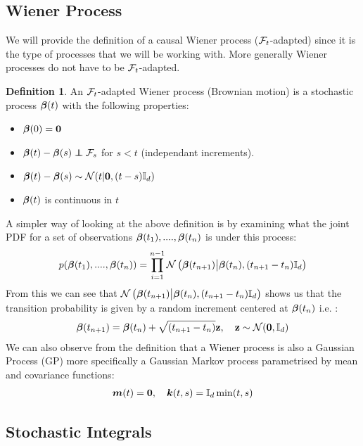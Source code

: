 \documentclass[a4paper,12pt,twoside,openright]{report}
\theoremstyle{definition}
\newtheorem{definition}{Definition}[section]
\begin{document}
\subsection{Wiener Process}

We will provide the definition of a causal Wiener process (${\mathcal{F}}_t$-adapted) since it is the type of processes that we will be working with. More generally Wiener processes do not have to be ${\mathcal{F}}_t$-adapted.
\begin{definition}
    An ${\mathcal{F}}_t$-adapted Wiener process (Brownian motion) is a stochastic process ${\bm{\beta}}(t)$ with the following properties:
    \begin{itemize}
        \item ${\bm{\beta}}(0) = {\bm{0}}$
        \item  $\rvw(t) - \rvw(s) \independent \calF_s$  for $s < t$ (independant increments).
        \item ${\bm{\beta}}(t) - {\bm{\beta}}(s) \sim {\mathcal{N}} (t | {\bm{0}},  (t - s) {\mathbb{I}_d}) $
        \item ${\bm{\beta}}(t)$ is continuous in $t$
    \end{itemize}
\end{definition}
A simpler way of looking at the above definition is by examining what the joint PDF for a set of observations ${\bm{\beta}}(t_1), ...., {\bm{\beta}}(t_n)$  is under this process:
\begin{align*}
    p({\bm{\beta}}(t_1), ...., {\bm{\beta}}(t_n)) = \prod_{i=1}^{n-1} {\mathcal{N}}\left({\bm{\beta}}(t_{n+1})\big| {\bm{\beta}}(t_{n}), (t_{n+1}- t_{n}){\mathbb{I}_d} \right)
\end{align*}
From this we can see that ${\mathcal{N}}\left({\bm{\beta}}(t_{n+1})\big| {\bm{\beta}}(t_{n}), (t_{n+1}- t_{n}){\mathbb{I}_d} \right)$ shows us that the transition probability is given by a random increment  centered at  ${\bm{\beta}}(t_{n})$ i.e. :
\begin{align*}
    {\bm{\beta}}(t_{n+1}) = {\bm{\beta}}(t_{n}) +  \sqrt{(t_{n+1}- t_{n})}{\mathbf{z}} , \quad {\mathbf{z}} \sim {\mathcal{N}}({\bm{0}}, {\mathbb{I}_d}) 
\end{align*}
We can also observe from the definition that a Wiener process is also a Gaussian Process (GP) more specifically a Gaussian Markov process parametrised by mean and covariance functions:
\begin{align*}
    {\bm{m}}(t) = {\bm{0}}, \quad {\bm{k}}(t, s) = {\mathbb{I}_d}\min(t, s)
\end{align*}

\subsection{Stochastic Integrals}
\end{document}
